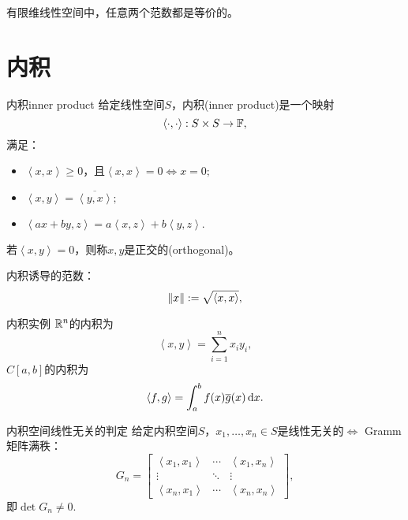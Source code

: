 \begin{theorem}
    {}{}
    有限维线性空间中，任意两个范数都是等价的。
\end{theorem}


\section{内积}
\label{sec:inner product}

\newcommand{\inp}[2]{\left\langle #1,#2\right\rangle}  %


\begin{definition}
    {内积}{inner product}
    给定线性空间$S$，内积(inner product)是一个映射
    \begin{equation}
        \inp\cdot\cdot:S\times S\to\FF,
    \end{equation}
    满足：
    \begin{itemize}
        \item $\inp xx\geq 0$，且$\inp xx=0\iff x=0;$
        \item $\inp xy=\overline{\inp yx};$
        \item $\inp{ax+by}z=a\inp xz+b\inp yz.$
    \end{itemize}
    若$\inp xy=0$，则称$x,y$是正交的(orthogonal)。
\end{definition}

内积诱导的范数：
\begin{equation}
    \norm x:=\sqrt{\inp xx},
\end{equation}

\begin{example}
    {内积实例}{}
    $\mathbb R^n$的内积为
    \[
        \inp xy=\sum_{i=1}^nx_iy_i,
    \]
    $C[a,b]$的内积为 
    \[
        \inp fg=\int_a^bf(x)\overline g(x)\d x.
    \]
\end{example}

\begin{theorem}
    {内积空间线性无关的判定}{}
    给定内积空间$S$，$x_1,\ldots,x_n\in S$是线性无关的$\iff$ Gramm矩阵满秩：
    \begin{equation}
        G_n=\begin{bmatrix}
            \inp{x_1}{x_1}&\cdots&\inp{x_1}{x_n}\\
            \vdots&\ddots&\vdots\\
            \inp{x_n}{x_1}&\cdots&\inp{x_n}{x_n}
        \end{bmatrix},
    \end{equation}
    即$\det G_n\neq 0.$
\end{theorem}


